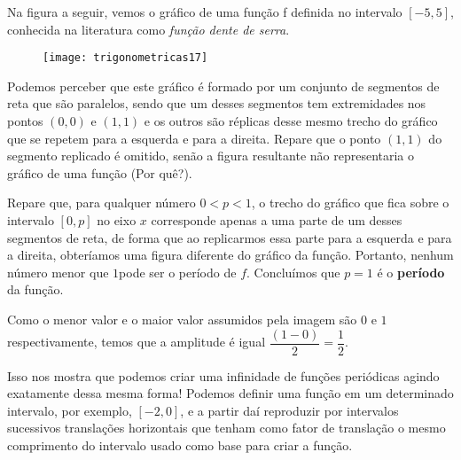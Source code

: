 Na figura a seguir, vemos o gráfico de uma função f definida no intervalo $[-5,5]$, conhecida na literatura como \textit{função dente de serra}.

\begin{figure}[H]
\centering

\texttt{[image: trigonometricas17]}
\end{figure}


Podemos perceber que este gráfico é formado por um conjunto de segmentos de reta que são paralelos, sendo que um desses segmentos tem extremidades nos pontos $(0,0)$ e $(1,1)$ e os outros são réplicas desse mesmo trecho do gráfico que se repetem para a esquerda e para a direita. Repare que o ponto $(1,1)$ do segmento replicado é omitido, senão a figura resultante não representaria o gráfico de uma função (Por quê?).

Repare que, para qualquer número $0 < p < 1$, o trecho do gráfico que fica sobre o intervalo $[0, p]$ no eixo $x$ corresponde apenas a uma parte de um desses segmentos de reta, de forma que ao replicarmos essa parte para a esquerda e para a direita, obteríamos uma figura diferente do gráfico da função. Portanto, nenhum número menor que $1 $pode ser o período de $f$. Concluímos que $p =1$ é o \textbf{período} da função.

Como o menor valor e o maior valor assumidos pela imagem são $0$ e $1$ respectivamente, temos que a amplitude é igual $\dfrac{(1-0)}{2}=\dfrac{1}{2}$.

Isso nos mostra que podemos criar uma infinidade de funções periódicas agindo exatamente dessa mesma forma! Podemos definir uma função em um determinado intervalo, por exemplo, $[-2, 0]$, e a partir daí reproduzir por intervalos sucessivos translações horizontais que tenham como fator de translação o mesmo comprimento do intervalo usado como base para criar a função.

\label{trig-prac1}
\phantom{M}
\vspace{-1em}
\vspace{-\baselineskip}

